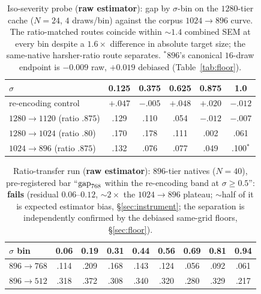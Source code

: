 \begin{table}[h]
\caption{Iso-severity probe (\textbf{raw estimator}): gap by $\sigma$-bin
on the $1280$-tier cache
($N{=}24$, $4$ draws/bin) against the corpus $1024{\to}896$ curve. The
ratio-matched routes coincide within ${\sim}1.4$ combined SEM at every bin
despite a $1.6\times$ difference in absolute target size; the same-native
harsher-ratio route separates. $^{*}$$896$'s canonical $16$-draw endpoint
is $-0.009$ raw, $+0.019$ debiased (Table~\ref{tab:floor}).}
\label{tab:isoseverity}
\centering
\small
\begin{tabular}{lccccc}
\toprule
$\sigma$ & 0.125 & 0.375 & 0.625 & 0.875 & 1.0 \\
\midrule
re-encoding control & $+.047$ & $-.005$ & $+.048$ & $+.020$ & $-.012$ \\
$1280{\to}1120$ (ratio $.875$) & .129 & .110 & .054 & $-.012$ & $-.007$ \\
$1280{\to}1024$ (ratio $.80$)  & .170 & .178 & .111 & .002 & .061 \\
$1024{\to}896$ (ratio $.875$)  & .132 & .076 & .077 & .049 & .100$^{*}$ \\
\bottomrule
\end{tabular}
\end{table}

\begin{table}[h]
\caption{Ratio-transfer run (\textbf{raw estimator}): $896$-tier natives
($N{=}40$), pre-registered
bar ``$\mathrm{gap}_{768}$ within the re-encoding band at $\sigma \ge 0.5$'':
\textbf{fails} (residual $0.06$--$0.12$, ${\sim}2\times$ the
$1024{\to}896$ plateau; ${\sim}$half of it is expected estimator bias,
\S\ref{sec:instrument}; the separation is independently confirmed by
the debiased same-grid floors, \S\ref{sec:floor}).}
\label{tab:phase1a}
\centering
\small
\begin{tabular}{lcccccccc}
\toprule
$\sigma$ bin & 0.06 & 0.19 & 0.31 & 0.44 & 0.56 & 0.69 & 0.81 & 0.94 \\
\midrule
$896{\to}768$ & .114 & .209 & .168 & .143 & .124 & .056 & .092 & .061 \\
$896{\to}512$ & .318 & .372 & .308 & .340 & .320 & .280 & .329 & .217 \\
\bottomrule
\end{tabular}
\end{table}

